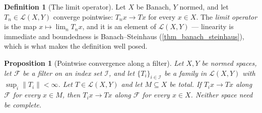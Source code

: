 \documentclass[a4paper]{report}
\theoremstyle{plain}
\newtheorem{proposition}[theorem]{Proposition}
\theoremstyle{definition}
\newtheorem{definition}[theorem]{Definition}
\theoremstyle{remark}
\begin{document}
\begin{definition}[The limit operator]
  \label{def_limit_operator}
  Let $X$ be Banach, $Y$ normed, and let $T_n \in \mathcal{L}(X,Y)$ converge pointwise:
  $T_nx \to Tx$ for every $x \in X$.  The \emph{limit operator} is the map
  $x \mapsto \lim_n T_nx$, and it is an element of $\mathcal{L}(X,Y)$ --- linearity is
  immediate and boundedness is Banach--Steinhaus (\cref{thm_banach_steinhaus}), which is
  what makes the definition well posed.
\end{definition}


\begin{proposition}[Pointwise convergence along a filter]
  \label{prop_dense_ptwise_filter}
  Let $X,Y$ be normed spaces, let $\mathcal{F}$ be a filter on an index set $\mathcal{I}$,
  and let $\{T_i\}_{i \in \mathcal{I}}$ be a family in $\mathcal{L}(X,Y)$ with
  $\sup_{i}\|T_i\| < \infty$.  Let $T \in \mathcal{L}(X,Y)$ and let $M \subseteq X$ be
  total.  If $T_ix \to Tx$ along $\mathcal{F}$ for every $x \in M$, then $T_ix \to Tx$
  along $\mathcal{F}$ for every $x \in X$.  Neither space need be complete.
\end{proposition}
\end{document}

